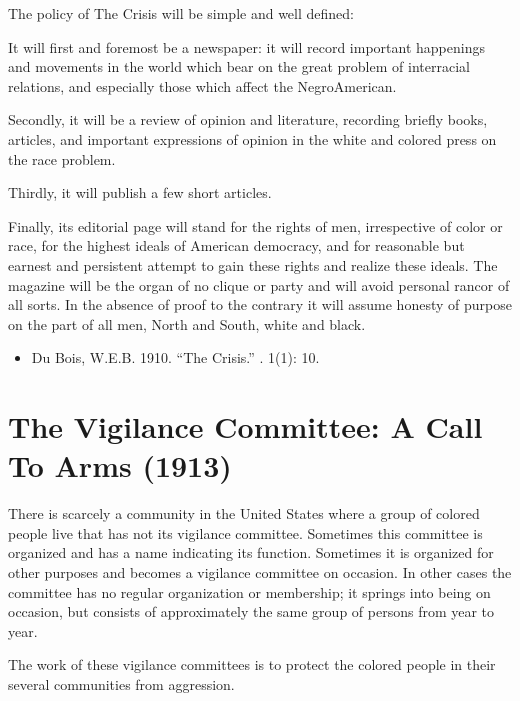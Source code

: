 \documentclass[letterpaper,10pt,english]{jupyterBook}
\begin{document}
\sphinxAtStartPar
The policy of The Crisis will be simple and well defined:

\sphinxAtStartPar
It will first and foremost be a newspaper: it will record important happenings and movements in the world which bear on the great problem of inter\sphinxhyphen{}racial relations, and especially those which affect the Negro\sphinxhyphen{}American.

\sphinxAtStartPar
Secondly, it will be a review of opinion and literature, recording briefly books, articles, and important expressions of opinion in the white and colored press on the race problem.

\sphinxAtStartPar
Thirdly, it will publish a few short articles.

\sphinxAtStartPar
Finally, its editorial page will stand for the rights of men, irrespective of color or race, for the highest ideals of American democracy, and for reasonable but earnest and persistent attempt to gain these rights and realize these ideals. The magazine will be the organ of no clique or party and will avoid personal rancor of all sorts. In the absence of proof to the contrary it will assume honesty of purpose on the part of all men, North and South, white and black.
\begin{itemize}
\item {} 
\sphinxAtStartPar
Du Bois, W.E.B. 1910. “The Crisis.” . 1(1): 10.

\end{itemize}


\section{The Vigilance Committee: A Call To Arms (1913)}
\label{\detokenize{Volumes/06/01/vigilance_committee:the-vigilance-committee-a-call-to-arms-1913}}\label{\detokenize{Volumes/06/01/vigilance_committee::doc}}
\sphinxAtStartPar
There is scarcely a community in the United States where a group of colored people live that has not its vigilance committee. Sometimes this committee is organized and has a name indicating its function. Sometimes it is organized for other purposes and becomes a vigilance committee on occasion. In other cases the committee has no regular organization or membership; it springs into being on occasion, but consists of approximately the same group of persons from year to year.

\sphinxAtStartPar
The work of these vigilance committees is to protect the colored people in their several communities from aggression.
\end{document}
